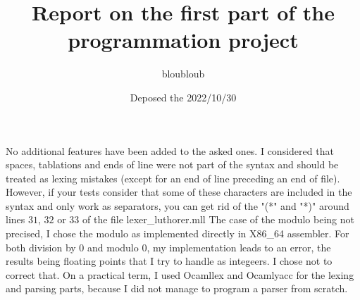 \documentclass{article}
\title{Report on the first part of the programmation project}
\author{bloubloub}
\date{Deposed the 2022/10/30}
\begin{document}
\maketitle
No additional features have been added to the asked ones. I considered that spaces, tablations and ends of line were not part of the syntax and should be treated as lexing mistakes (except for an end of line preceding an end of file). \newline However, if your tests consider that some of these characters are included in the syntax and only work as separators, you can get rid of the "(*" and "*)" around lines $31$, $32$ or $33$ of the file lexer\_luthorer.mll
\newline\newline The case of the modulo being not precised, I chose the modulo as implemented directly in X86\_64 assembler.
\newline\newline For both division by 0 and modulo 0, my implementation leads to an error, the results being floating points that I try to handle as integeers. I chose not to correct that.
\newline\newline On a practical term, I used Ocamllex and Ocamlyacc for the lexing and parsing parts, because I did not manage to program a parser from scratch.
\end{document}
